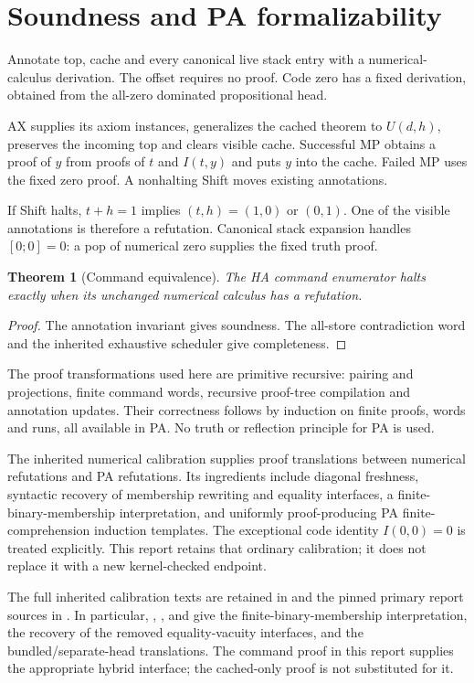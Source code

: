 \documentclass[11pt]{article}
\newtheorem{theorem}{Theorem}[section]
\begin{document}
\section{Soundness and PA formalizability}

Annotate top, cache and every canonical live stack entry with a numerical-calculus derivation. The offset requires no proof. Code zero has a fixed derivation, obtained from the all-zero dominated propositional head.

AX supplies its axiom instances, generalizes the cached theorem to $U(d,h)$, preserves the incoming top and clears visible cache. Successful MP obtains a proof of $y$ from proofs of $t$ and $I(t,y)$ and puts $y$ into the cache. Failed MP uses the fixed zero proof. A nonhalting Shift moves existing annotations.

If Shift halts, $t+h=1$ implies $(t,h)=(1,0)$ or $(0,1)$. One of the visible annotations is therefore a refutation. Canonical stack expansion handles $[0;0]=0$: a pop of numerical zero supplies the fixed truth proof.

\begin{theorem}[Command equivalence]
The HA command enumerator halts exactly when its unchanged numerical calculus has a refutation.
\end{theorem}
\begin{proof}
The annotation invariant gives soundness. The all-store contradiction word and the inherited exhaustive scheduler give completeness.
\end{proof}

The proof transformations used here are primitive recursive: pairing and projections, finite command words, recursive proof-tree compilation and annotation updates. Their correctness follows by induction on finite proofs, words and runs, all available in PA. No truth or reflection principle for PA is used.

The inherited numerical calibration \cite{calibration} supplies proof translations between numerical refutations and PA refutations. Its ingredients include diagonal freshness, syntactic recovery of membership rewriting and equality interfaces, a finite-binary-membership interpretation, and uniformly proof-producing PA finite-comprehension induction templates. The exceptional code identity $I(0,0)=0$ is treated explicitly. This report retains that ordinary calibration; it does not replace it with a new kernel-checked endpoint.


The full inherited calibration texts are retained in
 and the pinned primary report sources in
. In particular,
, , and
 give the finite-binary-membership
interpretation, the recovery of the removed equality-vacuity interfaces,
and the bundled/separate-head translations. The command proof in this
report supplies the appropriate hybrid interface; the cached-only proof
is not substituted for it.
\end{document}
